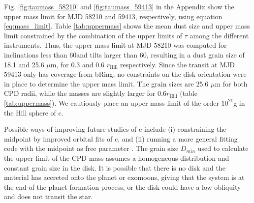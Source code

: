 
%
Fig. \ref{fig:taumass_58210} and \ref{fig:taumass_59413} in the Appendix show the upper mass limit for MJD 58210 and 59413, respectively, using equation \ref{eq:mass_limit}.
%
Table \ref{tab:uppermass} shows the mean dust size and upper mass limit constrained by the combination of the upper limits of $\tau$ among the different instruments.
%
Thus, the upper mass limit at MJD 58210 was computed for inclinations less than 60\textdegree and tilts larger than 60\textdegree, resulting in a dust grain size of 18.1 and 25.6 $\mu$m, for 0.3 and 0.6 $r_{\text{Hill}}$ respectively. 
%
Since the transit at MJD 59413 only has coverage from bRing, no constraints on the disk orientation were in place to determine the upper mass limit. 
%
The grain sizes are 25.6 $\mu$m for both CPD radii, while the masses are slightly larger for 0.6$r_{\text{Hill}}$ (table \ref{tab:uppermass}).  
%
We cautiously place an upper mass limit of the order $10^{21}$g in the Hill sphere of \pic c. 

Possible ways of improving future studies of \bpic c include (i) constraining the midpoint by improved orbital fits of \pic c, and (ii) running a more general fitting code with the midpoint as free parameter \citep[e.g. \texttt{emcee}; ][]{Foreman_Mackey_2013}.
%
The grain size $D_{min}$ used to calculate the upper limit of the CPD mass assumes a homogeneous distribution and constant grain size in the disk.  
%
It is possible that there is no disk and the material has accreted onto the planet or exomoons, giving that the system is at the end of the planet formation process, or the disk could have a low obliquity and does not transit the star.  
